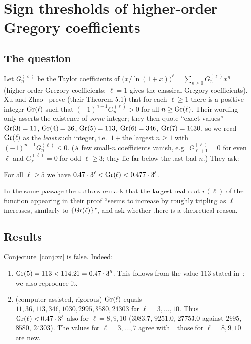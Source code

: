 \section{Sign thresholds of higher-order Gregory coefficients}\label{sec:gregory}

\subsection{The question}
Let $G_n^{(\ell)}$ be the Taylor coefficients of $\big(x/\ln(1+x)\big)^\ell=\sum_{n\ge0}G_n^{(\ell)}x^n$ (higher-order Gregory coefficients; $\ell=1$ gives the classical Gregory coefficients). Xu and Zhao~\cite{XZ} prove (their Theorem 5.1) that for each $\ell\ge1$ there is a positive integer $\mathrm{Gr}(\ell)$ such that $(-1)^{n-1}G_n^{(\ell)}>0$ for all $n\ge\mathrm{Gr}(\ell)$. Their wording only asserts the existence of \emph{some} integer; they then quote ``exact values'' $\mathrm{Gr}(3)=11$, $\mathrm{Gr}(4)=36$, $\mathrm{Gr}(5)=113$, $\mathrm{Gr}(6)=346$, $\mathrm{Gr}(7)=1030$, so we read $\mathrm{Gr}(\ell)$ as the \emph{least} such integer, i.e.\ $1+{}$the largest $n\ge1$ with $(-1)^{n-1}G_n^{(\ell)}\le0$. (A few small-$n$ coefficients vanish, e.g.\ $G^{(\ell)}_{\ell+1}=0$ for even $\ell$ and $G_\ell^{(\ell)}=0$ for odd $\ell\ge3$; they lie far below the last bad $n$.) They ask:

\begin{conjecture}\label{conj:xz}
For all $\ell\ge5$ we have $0.47\cdot3^\ell<\mathrm{Gr}(\ell)<0.477\cdot3^\ell$.
\end{conjecture}

In the same passage the authors remark that the largest real root $r(\ell)$ of the function appearing in their proof ``seems to increase by roughly tripling as $\ell$ increases, similarly to $\{\mathrm{Gr}(\ell)\}$'', and ask whether there is a theoretical reason.

\subsection{Results}
\begin{theorem}\label{thm:gregory}
Conjecture~\ref{conj:xz} is false. Indeed:
\begin{enumerate}[label=(\roman*),leftmargin=2em]
\item $\mathrm{Gr}(5)=113<114.21=0.47\cdot3^5$. This follows from the value $113$ stated in~\cite{XZ}; we also reproduce it.
\item (computer-assisted, rigorous) $\mathrm{Gr}(\ell)$ equals $11,36,113,346,1030,2995,8580,24303$ for $\ell=3,\dots,10$. Thus $\mathrm{Gr}(\ell)<0.47\cdot3^\ell$ also for $\ell=8,9,10$ ($3083.7$, $9251.0$, $27753.0$ against $2995$, $8580$, $24303$). The values for $\ell=3,\dots,7$ agree with~\cite{XZ}; those for $\ell=8,9,10$ are new.
\end{enumerate}
\end{theorem}

